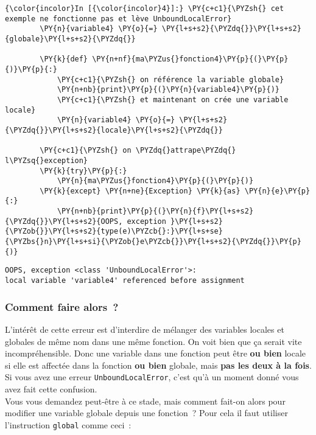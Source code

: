     \begin{Verbatim}[commandchars=\\\{\}]
{\color{incolor}In [{\color{incolor}4}]:} \PY{c+c1}{\PYZsh{} cet exemple ne fonctionne pas et lève UnboundLocalError}
        \PY{n}{variable4} \PY{o}{=} \PY{l+s+s2}{\PYZdq{}}\PY{l+s+s2}{globale}\PY{l+s+s2}{\PYZdq{}}
        
        \PY{k}{def} \PY{n+nf}{ma\PYZus{}fonction4}\PY{p}{(}\PY{p}{)}\PY{p}{:}
            \PY{c+c1}{\PYZsh{} on référence la variable globale}
            \PY{n+nb}{print}\PY{p}{(}\PY{n}{variable4}\PY{p}{)}
            \PY{c+c1}{\PYZsh{} et maintenant on crée une variable locale}
            \PY{n}{variable4} \PY{o}{=} \PY{l+s+s2}{\PYZdq{}}\PY{l+s+s2}{locale}\PY{l+s+s2}{\PYZdq{}}
        
        \PY{c+c1}{\PYZsh{} on \PYZdq{}attrape\PYZdq{} l\PYZsq{}exception}
        \PY{k}{try}\PY{p}{:}
            \PY{n}{ma\PYZus{}fonction4}\PY{p}{(}\PY{p}{)}
        \PY{k}{except} \PY{n+ne}{Exception} \PY{k}{as} \PY{n}{e}\PY{p}{:}
            \PY{n+nb}{print}\PY{p}{(}\PY{n}{f}\PY{l+s+s2}{\PYZdq{}}\PY{l+s+s2}{OOPS, exception }\PY{l+s+s2}{\PYZob{}}\PY{l+s+s2}{type(e)\PYZcb{}:}\PY{l+s+se}{\PYZbs{}n}\PY{l+s+si}{\PYZob{}e\PYZcb{}}\PY{l+s+s2}{\PYZdq{}}\PY{p}{)}
\end{Verbatim}


    \begin{Verbatim}[commandchars=\\\{\}]
OOPS, exception <class 'UnboundLocalError'>:
local variable 'variable4' referenced before assignment

    \end{Verbatim}

    \hypertarget{comment-faire-alors}{%
\subsubsection{Comment faire alors~?}\label{comment-faire-alors}}

    L'intérêt de cette erreur est d'interdire de mélanger des variables
locales et globales de même nom dans une même fonction. On voit bien que
ça serait vite incompréhensible. Donc une variable dans une fonction
peut être \textbf{ou bien} locale si elle est affectée dans la fonction
\textbf{ou bien} globale, mais \textbf{pas les deux à la fois}. Si vous
avez une erreur \texttt{UnboundLocalError}, c'est qu'à un moment donné
vous avez fait cette confusion.\\

    Vous vous demandez peut-être à ce stade, mais comment fait-on alors pour
modifier une variable globale depuis une fonction~? Pour cela il faut
utiliser l'instruction \texttt{global} comme ceci~:

